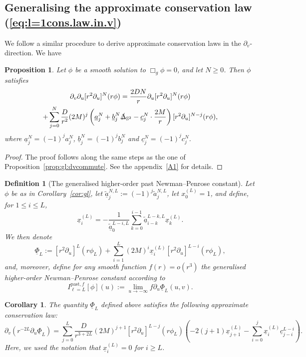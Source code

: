 \documentclass[11pt,english]{article}
\numberwithin{equation}{section}
\newtheorem{defi}{Definition}[section]
\newtheorem{cor}{Corollary}[section]
\theoremstyle{remark}
\theoremstyle{plain}
\newtheorem{prop}{Proposition}[section]
\theoremstyle{remark}
\newcommand{\pu}{\partial_u}
\newcommand{\pv}{\partial_v}
\renewcommand{\(}{\left(}
\renewcommand{\)}{\right)}
\newcommand{\ILp}[1]{I_{\ell=#1}^{\mathrm{past},f}}
\begin{document}
\subsection{Generalising the approximate conservation law (\ref{eq:l=1cons.law.in.v})}
We follow a similar procedure to derive approximate conservation laws in the $\pv$-direction. We have
\begin{prop}\label{prop:gl:ducommute}
Let $\phi$ be a smooth solution to $\Box_g\phi=0$, and let $N\geq 0$. Then $\phi$ satisfies
\begin{multline}\label{eq:gl:ducommute}
\pv\pu[r^2\pu]^N(r\phi)=\frac{2DN}{r}\pu[r^2\pu]^N(r\phi)\\+
\sum_{j=0}^N\frac{D}{r^2}(2M)^j\left(\underline{a}_j^N+\underline{b}_j^N\slashed{\Delta}_{\mathbb{S}^2}-\underline{c}_j^N\cdot\frac{2M}{r}\right)[r^2\pu]^{N-j}(r\phi),
\end{multline}
where $\underline{a}_j^N=(-1)^ja_j^N$, $\underline{b}_j^N=(-1)^jb_j^N$ and $\underline{c}_j^N=(-1)^jc_j^N$. 
\end{prop}
\begin{proof}
The proof follows along the same steps as the one of Proposition~\ref{prop:gl:dvcommute}. See the appendix~\ref{A1} for details.
\end{proof}
\begin{defi}[The generalised higher-order past Newman--Penrose constant]
Let $\phi$ be as in Corollary~\ref{cor:gl}, let $\tilde{\underline{a}}_j^{N,L}:=(-1)^j\tilde{a}_j^{N,L}$, let $x^{(L)}_0=1$, and define, for $1\leq i\leq L$,
\begin{equation}
\underline{x}_i^{(L)}=-\dfrac{1}{\tilde{\underline{a}}_0^{L-i,L}}\sum_{k=0}^{i-1}\tilde{\underline{a}}_{i-k}^{L-k,L}\underline{x}^{(L)}_k.
\end{equation}
We then denote
\begin{equation}\label{eq:NPpast}
\underline{\Phi}_{L}:=[r^2\pu]^L(r\phi_{L})+\sum_{i=1}^L(2M)^i\underline{x}_i^{(L)}[r^2\pu]^{L-i}(r\phi_{L}),
\end{equation}
and, moreover, define for any smooth function $f(r)=o(r^3)$ the generalised higher-order Newman--Penrose constant according to
\begin{equation}
\ILp{L}[\phi](u):=\lim_{u\to-\infty}f\pu\underline{\Phi}_L(u,v).
\end{equation}
\end{defi}
\begin{cor}
The quantity $\underline{\Phi}_{L}$ defined above satisfies the following approximate conservation law:
\begin{equation}\label{eq:gl:approx.v}
\pv(r^{-2L}\pu\underline{\Phi}_L)
=\sum_{j=0}^L\frac{D}{r^{3+2L}}(2M)^{j+1}[r^2\pu]^{L-j}(r\phi_{L})\left(-2(j+1)\underline{x}^{(L)}_{j+1}-\sum_{i=0}^j \underline{x}_i^{(L)} \underline{c}_{j-i}^{L-i}\right) .
\end{equation}
Here, we used the notation that $\underline{x}_i^{(L)}=0$ for $i\geq L$.
\end{cor}
\end{document}
